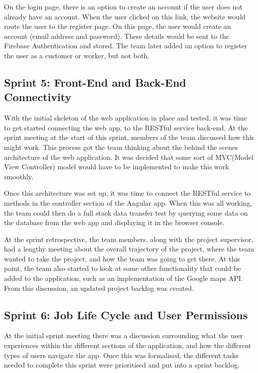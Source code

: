 \bigskip

On the login page, there is an option to create an account if the user does not already have an account. When the user clicked on this link, the website would route the user to the register page. On this page, the user would create an account (email address and password). These details would be sent to the Firebase Authentication and stored. The team later added an option to register the user as a customer or worker, but not both.

\subsection{Sprint 5: Front-End and Back-End Connectivity}
\label{sec:MethodologySprint5}
With the initial skeleton of the web application in place and tested, it was time to get started connecting the web app, to the RESTful service back-end. At the sprint meeting at the start of this sprint, members of the team discussed how this might work. This process got the team thinking about the behind the scenes architecture of the web application. It was decided that some sort of MVC(Model View Controller) model would have to be implemented to make this work smoothly. 

\bigskip

Once this architecture was set up, it was time to connect the RESTful service to methods in the controller section of the Angular app. When this was all working, the team could then do a full stack data transfer test by querying some data on the database from the web app and displaying it in the browser console.

\bigskip

At the sprint retrospective, the team members, along with the project supervisor, had a lengthy meeting about the overall trajectory of the project, where the team wanted to take the project, and how the team was going to get there. At this point, the team also started to look at some other functionality that could be added to the application, such as an implementation of the Google maps API. From this discussion, an updated project backlog was created.


\subsection{Sprint 6: Job Life Cycle and User Permissions}
\label{sec:MethodologySprint6}
At the initial sprint meeting there was a discussion surrounding what the user experiences within the different sections of the application, and how the different types of users navigate the app. Once this was formalised, the different tasks needed to complete this sprint were prioritised and put into a sprint backlog. 

